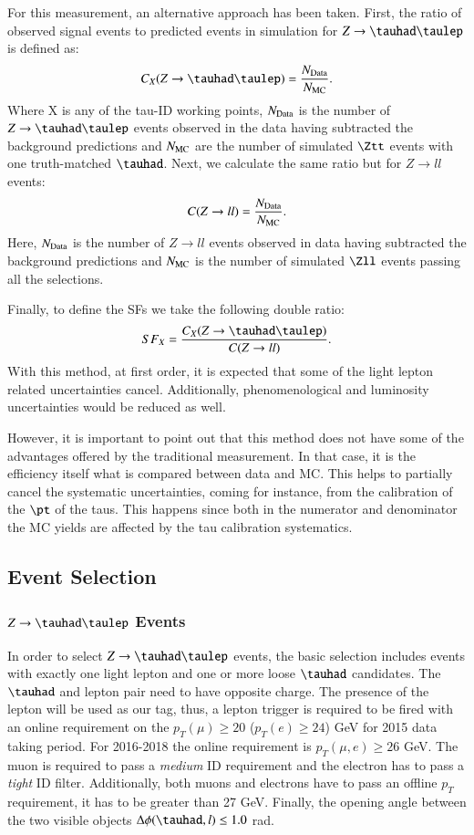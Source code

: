 For this measurement, an alternative approach has been taken. First, the ratio of observed signal events to predicted events in simulation for $Z\to\tauhad\taulep$ is defined as:
\begin{equation}
	C_{X}(Z\to\tauhad\taulep)=\frac{\NData}{\NMC}.
	\label{eq14}
\end{equation}
Where X is any of the tau-ID working points, $N_{\text{Data}}$ is the number of $Z\to\tauhad\taulep$ events observed in the data having subtracted the background predictions and $N_{\text{MC}}$ are the number of simulated $\Ztt$ events with one truth-matched $\tauhad$. Next, we calculate the same ratio but for $Z\to ll$ events:
\begin{equation}
C(Z\to ll)=\frac{N_{\text{Data}}}{N_{\text{MC}}}.
\end{equation}
Here, $N_{\text{Data}}$ is the number of $Z\to ll$ events observed in data having subtracted the background predictions and $N_{\text{MC}}$ is the number of simulated $\Zll$ events passing all the selections.

Finally, to define the SFs we take the following double ratio:
\begin{equation}
SF_{X}=\frac{C_{X}(Z\to\tauhad\taulep)}{C(Z\to ll)}.
\end{equation}
With this method, at first order, it is expected that some of the light lepton related uncertainties cancel. Additionally, phenomenological and luminosity uncertainties would be reduced as well.

However, it is important to point out that this method does not have some of the advantages offered by the traditional measurement. In that case, it is the efficiency itself what is compared between data and MC. This helps to partially cancel the systematic uncertainties, coming for instance, from the calibration of the $\pt$ of the taus. This happens since both in the numerator and denominator the MC yields are affected by the tau calibration systematics.
  
\subsection{Event Selection}\label{sec3.3}
\subsubsection{$Z\to\tauhad\taulep$ Events}\label{sec3.3.1}
In order to select $Z\to\tauhad\taulep$ events, the basic selection includes events with exactly one light lepton and one or more loose $\tauhad$ candidates. The $\tauhad$ and lepton pair need to have opposite charge. The presence of the lepton will be used as our tag, thus, a lepton trigger is required to be fired with an online requirement on the $p_{T}(\mu)\geq 20$ ($p_{T}(e)\geq 24$) GeV for 2015 data taking period. For 2016-2018 the online requirement is $p_{T}(\mu,e)\geq 26$ GeV. The muon is required to pass a \textit{medium} ID requirement and the electron has to pass a \textit{tight} ID filter. Additionally, both muons and electrons have to pass an offline $p_T$ requirement, it has to be greater than 27 GeV. Finally, the opening angle between the two visible objects $\Delta\phi(\tauhad,l)\leq 1.0$ rad.

